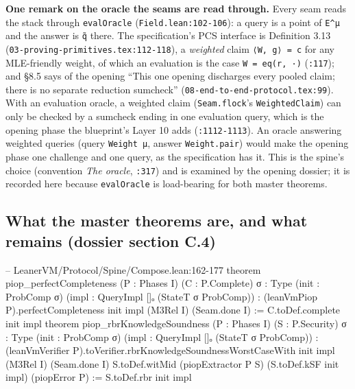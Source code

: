 \textbf{One remark on the oracle the seams are read through.} Every seam reads the stack through \texttt{evalOracle} (\texttt{Field.\allowbreak{}lean:102-{}106}): a query is a point of \texttt{E\textasciicircum{}μ} and the answer is \texttt{q̃} there. The specification's PCS interface is Definition 3.13 (\texttt{0\allowbreak{}3\allowbreak{}-{}\allowbreak{}p\allowbreak{}r\allowbreak{}o\allowbreak{}v\allowbreak{}i\allowbreak{}n\allowbreak{}g\allowbreak{}-{}\allowbreak{}p\allowbreak{}r\allowbreak{}i\allowbreak{}m\allowbreak{}i\allowbreak{}t\allowbreak{}i\allowbreak{}v\allowbreak{}e\allowbreak{}s\allowbreak{}.\allowbreak{}t\allowbreak{}e\allowbreak{}x\allowbreak{}:\allowbreak{}1\allowbreak{}1\allowbreak{}2\allowbreak{}-{}\allowbreak{}1\allowbreak{}1\allowbreak{}8}), a \emph{weighted} claim \texttt{⟨W,\allowbreak{} g⟩ = c} for any MLE-friendly weight, of which an evaluation is the case \texttt{W = eq(\allowbreak{}r,\allowbreak{} ·)} (\texttt{:117}); and §8.5 says of the opening \enquote{This one opening discharges every pooled claim; there is no separate reduction sumcheck} (\texttt{0\allowbreak{}8\allowbreak{}-{}\allowbreak{}e\allowbreak{}n\allowbreak{}d\allowbreak{}-{}\allowbreak{}t\allowbreak{}o\allowbreak{}-{}\allowbreak{}e\allowbreak{}n\allowbreak{}d\allowbreak{}-{}\allowbreak{}p\allowbreak{}r\allowbreak{}o\allowbreak{}t\allowbreak{}o\allowbreak{}c\allowbreak{}o\allowbreak{}l\allowbreak{}.\allowbreak{}t\allowbreak{}e\allowbreak{}x\allowbreak{}:\allowbreak{}9\allowbreak{}9}). With an evaluation oracle, a weighted claim (\texttt{Seam.\allowbreak{}flock}'s \texttt{WeightedClaim}) can only be checked by a sumcheck ending in one evaluation query, which is the opening phase the blueprint's Layer 10 adds (\texttt{:1112-{}1113}). An oracle answering weighted queries (query \texttt{Weight μ}, answer \texttt{Weight.\allowbreak{}pair}) would make the opening phase one challenge and one query, as the specification has it. This is the spine's choice (convention \emph{The oracle}, \texttt{:317}) and is examined by the opening dossier; it is recorded here because \texttt{evalOracle} is load-bearing for both master theorems.

\subsection{What the master theorems are, and what remains (dossier section C.4)}\label{sec:gen-spine-C4}

\begin{leancode}
-- LeanerVM/Protocol/Spine/Compose.lean:162-177
theorem piop_perfectCompleteness (P : Phases I) (C : P.Complete) {σ : Type}
    (init : ProbComp σ) (impl : QueryImpl []ₒ (StateT σ ProbComp)) :
    (leanVmPiop P).perfectCompleteness init impl (M3Rel I) (Seam.done I) :=
  C.toDef.complete init impl
theorem piop_rbrKnowledgeSoundness (P : Phases I) (S : P.Security) {σ : Type}
    (init : ProbComp σ) (impl : QueryImpl []ₒ (StateT σ ProbComp)) :
    (leanVmVerifier P).toVerifier.rbrKnowledgeSoundnessWorstCaseWith init impl (M3Rel I)
      (Seam.done I) S.toDef.witMid (piopExtractor P S) (S.toDef.kSF init impl)
      (piopError P) :=
  S.toDef.rbr init impl
\end{leancode}

